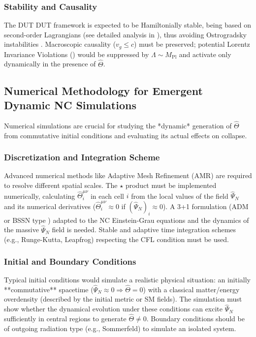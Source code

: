 \documentclass[11pt, a4paper]{article}
\theoremstyle{remark}
\newcommand{\Op}[1]{\hat{#1}}
\newcommand{\Mpl}{M_{\mathrm{Pl}}}
\begin{document}
\subsubsection{Stability and Causality}
\label{ssubsec:stability_causality_collapse}
The DUT DUT framework is expected to be Hamiltonially stable, being based on second-order Lagrangians (see detailed analysis in ), thus avoiding Ostrogradsky instabilities \citep{OstrogradskiRef, Woodard:2014wia}. Macroscopic causality (\( v_g \le c \)) must be preserved; potential Lorentz Invariance Violations () would be suppressed by \( \Lambda \sim \Mpl \) and activate only dynamically in the presence of \( \Op{\Theta} \).

\subsection{Numerical Methodology for Emergent Dynamic NC Simulations}
\label{subsec:collapse_numerics}

Numerical simulations are crucial for studying the *dynamic* generation of \( \Op{\Theta} \) from commutative initial conditions and evaluating its actual effects on collapse.

\subsubsection{Discretization and Integration Scheme}
\label{ssubsec:discretization_scheme}
Advanced numerical methods like Adaptive Mesh Refinement (AMR) are required to resolve different spatial scales. The \( \star \) product must be implemented numerically, calculating \( \Op{\Theta}^{\mu\nu}_i \) in each cell \( i \) from the local values of the field \( \Op{\Psi}_N \) and its numerical derivatives (\(\Op{\Theta}^{\mu\nu}_i \approx 0\) if \((\Op{\Psi}_N)_i \approx 0\)). A 3+1 formulation (ADM or BSSN type \citep{HenneauxTeitelboim1992}) adapted to the NC Einstein-Grau equations and the dynamics of the massive \( \Op{\Psi}_N \) field is needed. Stable and adaptive time integration schemes (e.g., Runge-Kutta, Leapfrog) respecting the CFL condition must be used.

\subsubsection{Initial and Boundary Conditions}
\label{ssubsec:initial_boundary_conditions}
Typical initial conditions would simulate a realistic physical situation: an initially **commutative** spacetime (\( \Op{\Psi}_N \approx 0 \Rightarrow \Op{\Theta} = 0 \)) with a classical matter/energy overdensity (described by the initial metric or SM fields). The simulation must show whether the dynamical evolution under these conditions can excite \( \Op{\Psi}_N \) sufficiently in central regions to generate \( \Op{\Theta} \neq 0 \). Boundary conditions should be of outgoing radiation type (e.g., Sommerfeld) to simulate an isolated system.
\end{document}
